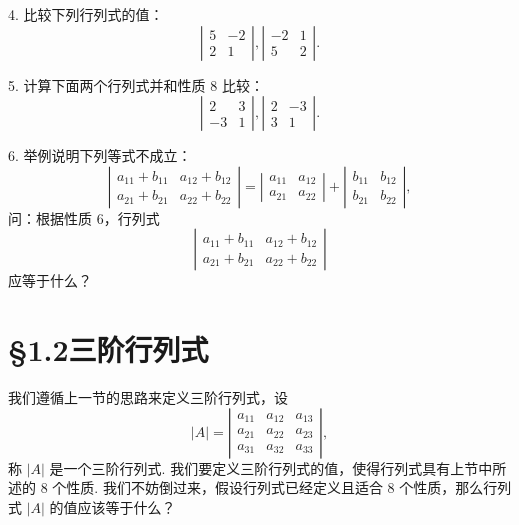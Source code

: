 \documentclass[UTF8,12pt,a4paper,fontset=fandol]{ctexart}
\begin{document}
4. 比较下列行列式的值：
\[
\left|\begin{array}{cc}
5 & -2\\
2 & 1
\end{array}\right|,
\left|\begin{array}{cc}
-2 & 1\\
5 & 2
\end{array}\right|.
\]

5. 计算下面两个行列式并和性质 8 比较：
\[
\left|\begin{array}{cc}
2 & 3\\
-3 & 1
\end{array}\right|,
\left|\begin{array}{cc}
2 & -3\\
3 & 1
\end{array}\right|.
\]

6. 举例说明下列等式不成立：
\[
\left|\begin{array}{cc}
a_{11}+b_{11} & a_{12}+b_{12}\\
a_{21}+b_{21} & a_{22}+b_{22}
\end{array}\right|
=
\left|\begin{array}{cc}
a_{11} & a_{12}\\
a_{21} & a_{22}
\end{array}\right|
+
\left|\begin{array}{cc}
b_{11} & b_{12}\\
b_{21} & b_{22}
\end{array}\right|,
\]
问：根据性质 6，行列式
\[
\left|\begin{array}{cc}
a_{11}+b_{11} & a_{12}+b_{12}\\
a_{21}+b_{21} & a_{22}+b_{22}
\end{array}\right|
\]
应等于什么？

\section*{§1.2\quad 三阶行列式}

我们遵循上一节的思路来定义三阶行列式，设
\begin{equation}
|A|=
\left|\begin{array}{ccc}
a_{11} & a_{12} & a_{13}\\
a_{21} & a_{22} & a_{23}\\
a_{31} & a_{32} & a_{33}
\end{array}\right|,
\tag{1.2.1}
\end{equation}
称 $|A|$ 是一个三阶行列式. 我们要定义三阶行列式的值，使得行列式具有上节中所述的 8 个性质. 我们不妨倒过来，假设行列式已经定义且适合 8 个性质，那么行列式 $|A|$ 的值应该等于什么？
\end{document}
